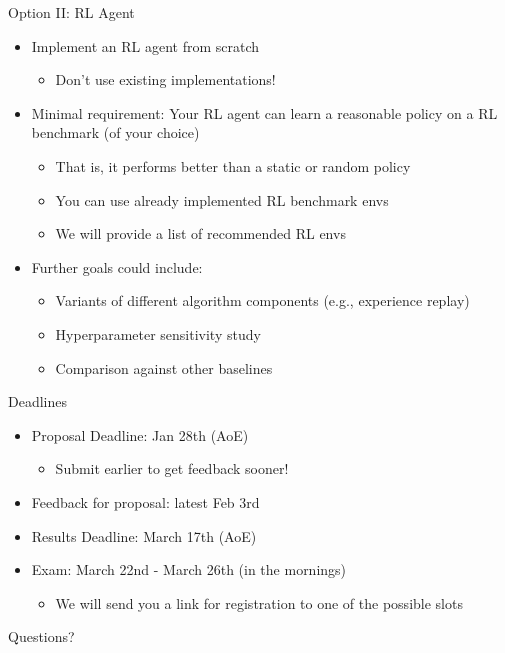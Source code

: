 \begin{frame}[c]{Option II: RL Agent}
	
	\begin{itemize}
		\item Implement an RL agent from scratch
		\begin{itemize}
			\item Don't use existing implementations!
		\end{itemize}
		\item Minimal requirement: Your RL agent can learn a reasonable policy on a RL benchmark (of your choice)
		\begin{itemize}
			\item That is, it performs better than a static or random policy
			\item You can use already implemented RL benchmark envs
			\item We will provide a list of recommended RL envs
		\end{itemize}
		\item Further goals could include:
		\begin{itemize}
			\item Variants of different algorithm components (e.g., experience replay)
			\item Hyperparameter sensitivity study
			\item Comparison against other baselines
		\end{itemize}
	\end{itemize}
	
\end{frame}
\begin{frame}[c]{Deadlines}
	
	\begin{itemize}
		\item Proposal Deadline: Jan 28th (AoE) 
		\begin{itemize}
			\item Submit earlier to get feedback sooner!
		\end{itemize}
		\item Feedback for proposal: latest Feb 3rd
		\item Results Deadline: March 17th (AoE) 
		\item Exam: March 22nd - March 26th (in the mornings)
		\begin{itemize}
			\item We will send you a link for registration to one of the possible slots
		\end{itemize}
	\end{itemize}
	
\end{frame}


\begin{frame}[c]{}
	
	\centering
	\huge
	Questions?
	
\end{frame}



